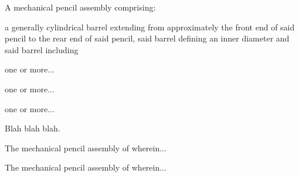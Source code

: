 
\begin{list}{}{\listspace}
  \item \cl A mechanical pencil assembly comprising:

  \item a generally cylindrical barrel extending from approximately the front end of said pencil to the rear end of said pencil, said barrel defining an inner diameter and said barrel including

  \begin{list}{}{\listspace}
    \item one or more...

    \item one or more...

    \item one or more...

  \end{list}

  \item Blah blah blah.
\end{list}


\cl The mechanical pencil assembly of  wherein...

\cl The mechanical pencil assembly of  wherein...



